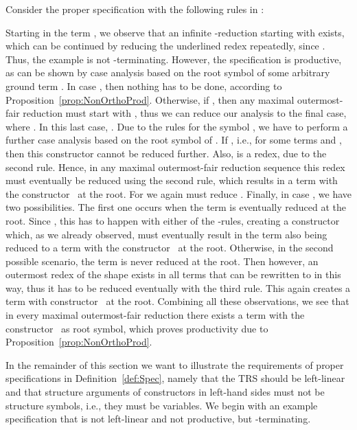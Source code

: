 \documentclass{eptcs}
\begin{document}
\begin{example}
\label{ex:IncompleteCSterm}
Consider the proper specification with the following rules in :


Starting in the term , we observe that an infinite -reduction
starting with  exists,
which can be continued by reducing the underlined redex repeatedly, since
.
Thus, the example is not -terminating. However, the specification is
productive, as can be shown by case analysis based on the root symbol of
some arbitrary ground term . In case , then nothing has to be
done, according to Proposition~\ref{prop:NonOrthoProd}.
Otherwise, if , then any maximal outermost-fair reduction
must start with , thus we can reduce our
analysis to the final case, where . In this last case,
. Due to the rules for the symbol , we have to
perform a further case analysis based on the root symbol of .
If , i.e.,  for some terms  and ,
then this constructor cannot be reduced further.
Also,  is a redex, due to the second rule.
Hence, in any maximal outermost-fair reduction sequence this redex must
eventually be reduced using the second rule, which results in a term with the
constructor~ at the root.
For  we again must reduce
.
Finally, in case , we have two possibilities. The first
one occurs when the term  is eventually reduced at the root. Since
, this has to happen with either of the -rules,
creating a constructor~ which, as we already observed, must eventually result
in the term  also being reduced to a term with the constructor~ at the
root. Otherwise, in the second possible scenario, the term  is never reduced
at the root. Then however, an outermost redex of the shape
 exists in all terms that  can be rewritten to in
this way, thus it has to be reduced eventually with the third rule. This again
creates a term with constructor~ at the root. Combining all these
observations, we see that in every maximal outermost-fair reduction there exists
a term with the constructor~ as root symbol, which proves productivity due to
Proposition~\ref{prop:NonOrthoProd}.
\end{example}


In the remainder of this section we want to illustrate the requirements
of proper specifications in Definition~\ref{def:Spec}, namely that the TRS
 should be left-linear and that structure arguments of constructors in
left-hand sides must not be structure symbols, i.e., they must be variables.
We begin with an example specification that is not left-linear and not
productive, but -terminating.
\end{document}
